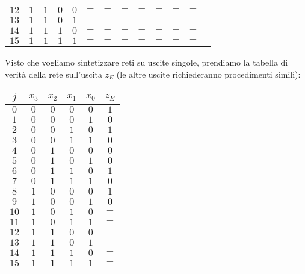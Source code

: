 \documentclass[a4paper,11pt]{article}
\begin{document}
\begin{table}[H]
\begin{tabular} { c | c c c c | c c c c c c c c }
		$12$ & $1$ & $1$ & $0$ & $0$ & $-$ & $-$ & $-$ & $-$ & $-$ & $-$ & $-$ \\
		$13$ & $1$ & $1$ & $0$ & $1$ & $-$ & $-$ & $-$ & $-$ & $-$ & $-$ & $-$ \\
		$14$ & $1$ & $1$ & $1$ & $0$ & $-$ & $-$ & $-$ & $-$ & $-$ & $-$ & $-$ \\
		$15$ & $1$ & $1$ & $1$ & $1$ & $-$ & $-$ & $-$ & $-$ & $-$ & $-$ & $-$ \\
	\end{tabular}
\end{table}

Visto che vogliamo sintetizzare reti su uscite singole, prendiamo la tabella di verità della rete sull'uscita $z_E$ (le altre uscite richiederanno procedimenti simili):

\begin{table}[H]
	\center 
	\begin{tabular} { c | c c c c | c }
		$j$ & $x_3$ & $x_2$ & $x_1$ & $x_0$ & $z_E$ \\
		\hline
		$0$ & $0$ & $0$ & $0$ & $0$ & $1$ \\
		$1$ & $0$ & $0$ & $0$ & $1$ & $0$ \\
		$2$ & $0$ & $0$ & $1$ & $0$ & $1$ \\
		$3$ & $0$ & $0$ & $1$ & $1$ & $0$ \\

		$4$ & $0$ & $1$ & $0$ & $0$ & $0$ \\
		$5$ & $0$ & $1$ & $0$ & $1$ & $0$ \\
		$6$ & $0$ & $1$ & $1$ & $0$ & $1$ \\
		$7$ & $0$ & $1$ & $1$ & $1$ & $0$ \\
	
		$8$ & $1$ & $0$ & $0$ & $0$ & $1$ \\
		$9$ & $1$ & $0$ & $0$ & $1$ & $0$ \\
		$10$ & $1$ & $0$ & $1$ & $0$ & $-$ \\
		$11$ & $1$ & $0$ & $1$ & $1$ & $-$ \\

		$12$ & $1$ & $1$ & $0$ & $0$ & $-$ \\
		$13$ & $1$ & $1$ & $0$ & $1$ & $-$ \\
		$14$ & $1$ & $1$ & $1$ & $0$ & $-$ \\
		$15$ & $1$ & $1$ & $1$ & $1$ & $-$ \\
	\end{tabular}
\end{table}
\end{document}
